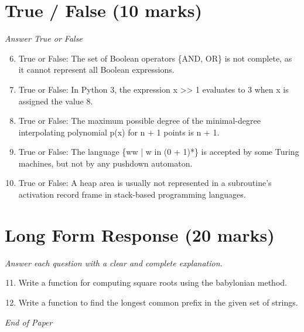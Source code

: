 \documentclass[12pt]{article}
\begin{document}
\section*{True / False (10 marks)}
\textit{Answer True or False}
\begin{enumerate}[label=\arabic*.]
\setcounter{enumi}{5}
\item True or False: The set of Boolean operators \{AND, OR\} is not complete, as it cannot represent all Boolean expressions.
\item True or False: In Python 3, the expression x \textgreater{}\textgreater{} 1 evaluates to 3 when x is assigned the value 8.
\item True or False: The maximum possible degree of the minimal-degree interpolating polynomial p(x) for n + 1 points is n + 1.
\item True or False: The language \{ww | w in (0 + 1)*\} is accepted by some Turing machines, but not by any pushdown automaton.
\item True or False: A heap area is usually not represented in a subroutine's activation record frame in stack-based programming languages.
\end{enumerate}

\section*{Long Form Response (20 marks)}
\textit{Answer each question with a clear and complete explanation.}
\begin{enumerate}[label=\arabic*.]
\setcounter{enumi}{10}
\item Write a function for computing square roots using the babylonian method.
\item Write a function to find the longest common prefix in the given set of strings.
\end{enumerate}

\vfill
\noindent\textit{End of Paper}
\end{document}
